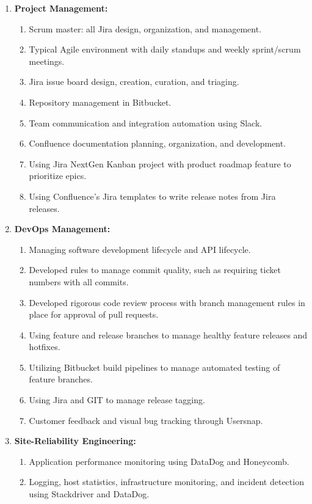 \documentclass[oneside]{article}%
\begin{document}
\begin{enumerate}[]
\begin{enumerate}[]
\begin{enumerate}[-]
				\end{enumerate}
			\item \textbf{Project Management:}
				\begin{enumerate}[-]
					\item Scrum master: all Jira design, organization, and management.
					\item Typical Agile environment with daily standups and weekly sprint/scrum meetings.
					\item Jira issue board design, creation, curation, and triaging.
					\item Repository management in Bitbucket.
					\item Team communication and integration automation using Slack.
					\item Confluence documentation planning, organization, and development.
					\item Using Jira NextGen Kanban project with product roadmap feature to prioritize epics.
					\item Using Confluence's Jira templates to write release notes from Jira releases.
				\end{enumerate}
			\item \textbf{DevOps Management:}
				\begin{enumerate}[-]
					\item Managing software development lifecycle and API lifecycle.
					\item Developed rules to manage commit quality, such as requiring ticket numbers with all commits.
					\item Developed rigorous code review process with branch management rules in place for approval of pull requests.
					\item Using feature and release branches to manage healthy feature releases and hotfixes.
					\item Utilizing Bitbucket build pipelines to manage automated testing of feature branches.
					\item Using Jira and GIT to manage release tagging.
					\item Customer feedback and visual bug tracking through Usersnap.
				\end{enumerate}
			\item \textbf{Site-Reliability Engineering:}
				\begin{enumerate}[-]
					\item Application performance monitoring using DataDog and Honeycomb.
					\item Logging, host statistics, infrastructure monitoring, and incident detection using Stackdriver and DataDog.

\end{enumerate}
\end{enumerate}
\end{enumerate}
\end{document}
